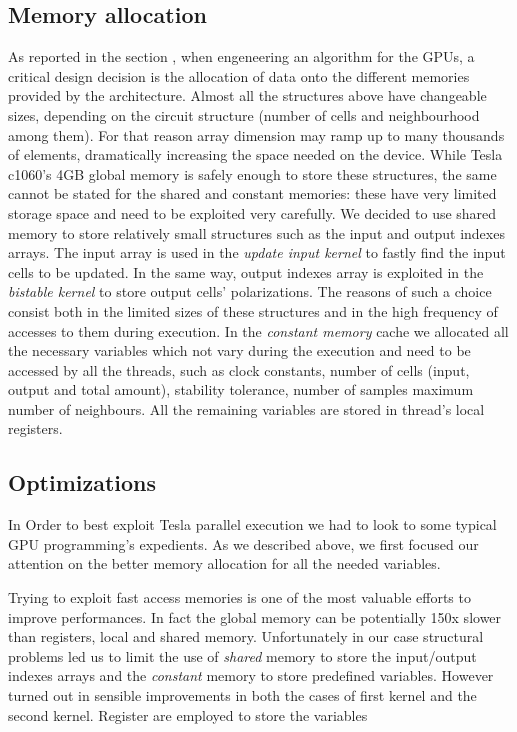 \subsection{Memory allocation}
As reported in the section \refname{\label{sec:art_of_cuda}}, when engeneering an algorithm for the GPUs, a critical
design decision is the allocation of data onto the different memories provided by the architecture.
Almost all the structures above have changeable sizes, depending on the circuit structure (number of cells and neighbourhood among them).
For that reason array dimension may ramp up to many thousands of elements, dramatically increasing the space needed on the device.
While Tesla c1060's 4GB global memory is safely enough to store these structures, the same cannot be stated for the shared and constant
memories: these have very limited storage space and need to be exploited very carefully.
We decided to use shared memory to store relatively small structures such as the input and output indexes arrays. The input array is used
in the \textit{update input kernel} to fastly find the input cells to be updated. In the same way, output indexes array is exploited 
in the \textit{bistable kernel} to store output cells' polarizations.\newline
The reasons of such a choice consist both in the limited sizes of these structures and in the high frequency of accesses to them during
execution.\newline
In the \textit{constant memory} cache we allocated all the necessary variables which not vary during the execution and need to be accessed
by all the threads, such as clock constants, number of cells (input, output and total amount), stability tolerance, number of samples 
 maximum number of neighbours. All the remaining variables are stored in thread's local registers.\newline

\subsection{Optimizations}
In Order to best exploit Tesla parallel execution we had to look to some typical GPU programming's expedients.
As we described above, we first focused our attention on the better memory allocation for all the needed variables.

Trying to exploit fast access memories is one of the most valuable efforts to improve performances.
In fact the global memory can be potentially 150x slower than registers, local and shared memory.\newline
Unfortunately in our case structural problems led us to limit the use of \textit{shared} memory to store the input/output indexes arrays and  the
\textit{constant} memory to store predefined variables. However turned out in sensible improvements in both the cases of first kernel and
the second kernel. Register are employed to store the variables












